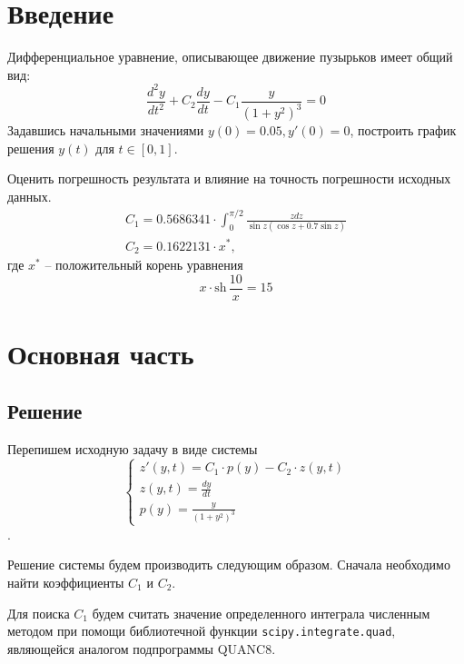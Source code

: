 \documentclass[a4paper,12pt]{article}
\begin{document}
	
	
	\tableofcontents
	\newpage
	
	\section{Введение}
	Дифференциальное уравнение, описывающее движение пузырьков имеет общий вид:
	\begin{equation}
		\frac{d^2 y}{dt^2} + C_2 \frac{dy}{dt} - C_1 \frac{y}{(1 + y^2)^3} = 0\label{eq:maintask}
	\end{equation}
	Задавшись начальными значениями $y(0) = 0.05, y'(0) = 0$, построить график решения $y(t)$ для
	$t \in [0, 1]$.

	Оценить погрешность результата и влияние на точность погрешности исходных данных.
	\begin{gather}
		C_1 = 0.5686341 \cdot \int_{0}^{\pi/2} \frac{zdz}{\sin z \left(\cos z + 0.7 \sin z\right)}\label{eq:taskc1}\\
		C_2 = 0.1622131 \cdot x^*,\label{eq:taskc2}
	\end{gather}
	где $x^*$ -- положительный корень уравнения
	\begin{equation*}
		x \cdot \text{sh}\, \frac{10}{x} = 15
	\end{equation*}

	\newpage
	
	\section{Основная часть}
	\subsection{Решение}
	Перепишем исходную задачу в виде системы
	\begin{equation}
		\begin{cases}
			\displaystyle z'(y, t) = C_1 \cdot p(y) - C_2 \cdot z(y, t) \\
			\displaystyle z(y, t) = \frac{dy}{dt} \\
			\displaystyle p(y) = \frac{y}{(1 + y^2)^3}
		\end{cases}
	\end{equation}.

	Решение системы будем производить следующим образом. Сначала необходимо найти
	коэффициенты $C_1$ и $C_2$. 
	
	Для поиска $C_1$ будем считать значение определенного интеграла
	численным методом при помощи библиотечной функции \texttt{scipy.integrate.quad}, являющейся
	аналогом подпрограммы QUANC8.
\end{document}
